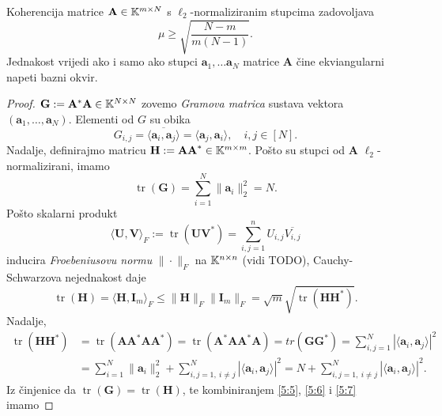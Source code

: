 \documentclass[a4paper,twoside,12pt]{memoir} %
\newcommand{\vect}[1]{\mathbf{#1}}
\renewcommand{\vec}{\vect}
\newcommand{\norm}[1]{\|{#1}\|}
\DeclareMathOperator{\tr}{tr}
\begin{document}
\begin{thm}\label{tm:5:7}
    Koherencija matrice $\vec A \in \K^{m \times N}$ s $\ell_2$-normaliziranim stupcima zadovoljava 
    \begin{equation}\label{5:4}
        \mu \geq \sqrt{\frac{N-m}{m(N-1)}}. 
    \end{equation}
    Jednakost vrijedi ako i samo ako stupci $\vec a_1, \dots \vec a_N$ matrice $\vec A$ \v{c}ine ekviangularni napeti bazni okvir.
\end{thm}
\begin{proof}
    $\vec G := \vec A^* \vec A \in \K^{N \times N}$ zovemo \textit{Gramova matrica} sustava vektora $(\vec a_1, \dots, \vec a_N)$. Elementi od $G$ su obika
    \begin{equation*}
        G_{i,j} = \overline{ \langle \vec a_i, \vec a_j \rangle}  =  \langle \vec a_j, \vec a_i \rangle, \quad i,j \in [N].
    \end{equation*}
    Nadalje, definirajmo matricu $\vec H := \vec{AA}^* \in \K^{m \times m}$. Po\v{s}to su stupci od $\vec A$ $\ell_2$-normalizirani, imamo
    \begin{equation}\label{5:5}
        \tr(\vec G) = \sum_{i = 1}^{N} \norm{\vec a_i}_2^2 = N.
    \end{equation}
    Po\v{s}to skalarni produkt
    \begin{equation*}
        \langle \vec U, \vec V \rangle_F := \tr(\vec{UV}^*) = \sum_{i,j = 1}^{n} U_{i,j}\overline{V_{i,j}}
    \end{equation*}
    inducira \textit{Froebeniusovu normu} $\norm{ \cdot }_F$ na $\mathbb{K}^{n \times n}$ (vidi TODO), Cauchy-Schwarzova nejednakost daje
    \begin{equation}\label{5:6}
        \tr(\vec H) = \langle \vec H, \vec I_m \rangle_F \leq \norm{\vec H}_F \norm{\vec I_m}_F = \sqrt{m} \sqrt{\tr(\vec{HH}^*)}.
    \end{equation}
    Nadalje,
    \begin{align}\label{5:7}
        \tr(\vec{HH}^*) &= \tr(\vec{AA}^* \vec{AA}^*) = \tr(\vec A^* \vec{AA}^* \vec A) = tr(\vec{GG}^*) = \sum_{i,j = 1}^N |\langle \vec a_i, \vec a_j \rangle|^2\nonumber\\ 
        &= \sum_{i=1}^N \norm{\vec a_i}_2^2 + \sum_{i,j = 1,\ i \neq j}^N |\langle \vec a_i, \vec a_j \rangle|^2 = N + \sum_{i,j = 1,\ i \neq j}^N |\langle \vec a_i, \vec a_j \rangle|^2.
    \end{align}
    Iz \v{c}injenice da $\tr(\vec G) = \tr(\vec H)$, te kombiniranjem \eqref{5:5}, \eqref{5:6} i \eqref{5:7} imamo

\end{proof}
\end{document}
